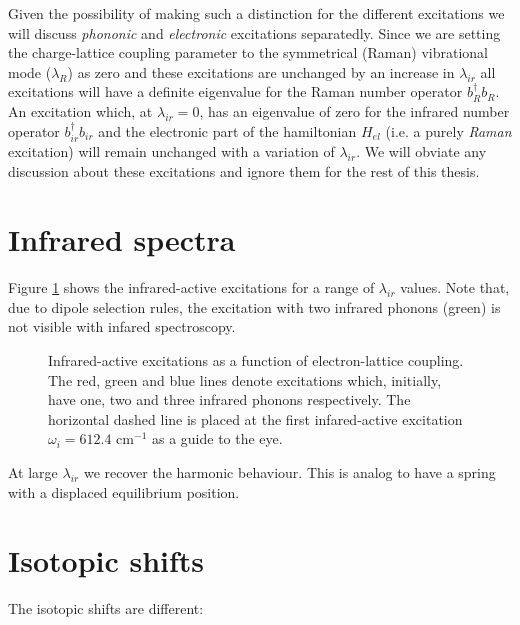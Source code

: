 Given the possibility of making such a distinction for the different excitations we will discuss \textit{phononic} and \textit{electronic} excitations separatedly. 
Since we are setting the charge-lattice coupling parameter to the symmetrical (Raman) vibrational mode ($\lambda_R$) as zero and these excitations are unchanged by an increase in $\lambda_{ir}$ all excitations will have a definite eigenvalue for the Raman number operator $b_R^\dagger b_R$. 
An excitation which, at $\lambda_{ir}=0$, has an eigenvalue of zero for the infrared number operator $b_{ir}^\dagger b_{ir}$ and the electronic part of the hamiltonian $H_{el}$ (i.e. a purely \textit{Raman} excitation) will remain unchanged with a variation of $\lambda_{ir}$.
We will obviate any discussion about these excitations and ignore them for the rest of this thesis. 


\section{Infrared spectra}
\label{sec:irSpectra}

Figure \ref{fig:irSpectra} shows the infrared-active excitations for a range of $\lambda_{ir}$ values.
Note that, due to dipole selection rules, the excitation with two infrared phonons (green) is not visible with infared spectroscopy.

\begin{figure}[h]
  \centering
  
  \caption[Infrared-active excitations as a function of electron-lattice coupling.]
  {Infrared-active excitations as a function of electron-lattice coupling.
  The red, green and blue lines denote excitations which, initially, have one, two and three infrared phonons respectively.
  The horizontal dashed line is placed at the first infared-active excitation $\omega_i=612.4$ cm$^{-1}$ as a guide to the eye.}
  \label{fig:irSpectra}
\end{figure}


At large $\lambda_{ir}$ we recover the harmonic behaviour. This is analog to have a spring with a displaced equilibrium position.


\section{Isotopic shifts}
\label{sec:irIsotopicShifts}

The isotopic shifts are different:

